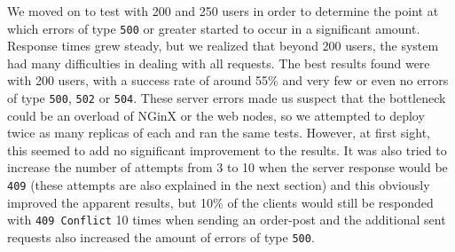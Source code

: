 \documentclass[12pt]{article}
\begin{document}
We moved on to test with 200 and 250 users in order to determine the point at which errors of type \texttt{500} or greater started to occur in a significant amount.
Response times grew steady, but we realized that beyond 200 users, the system had many difficulties in dealing with all requests.
The best results found were with 200 users, with a success rate of around 55\% and very few or even no errors of type \texttt{500}, \texttt{502} or \texttt{504}.
These server errors made us suspect that the bottleneck could be an overload of NGinX or the web nodes, so we attempted to deploy twice as many replicas of each 
and ran the same tests.
However, at first sight, this seemed to add no significant improvement to the results.
It was also tried to increase the number of attempts from 3 to 10 when the server response would be \texttt{409} (these attempts are also explained in the next 
section) and this obviously improved the apparent results,
but 10\% of the clients would still be responded with \texttt{409 Conflict} 10 times when sending an order-post and the additional sent requests also increased
the amount of errors of type \texttt{500}.
\end{document}
